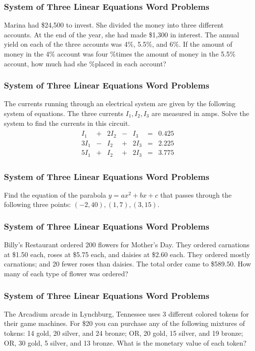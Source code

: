 \documentclass[xcolor=dvipsnames]{beamer}
\begin{document}
\begin{frame}
  \frametitle{System of Three Linear Equations Word Problems}
  {\ubung} Marina had \$24,500 to invest. She divided the money into
  three different accounts. At the end of the year, she had made
  \$1,300 in interest. The annual yield on each of the three accounts
  was 4\%, 5.5\%, and 6\%. If the amount of money in the 4\% account
  was four \%times the amount of money in the 5.5\% account, how much
  had she \%placed in each account?
\end{frame}

\begin{frame}
  \frametitle{System of Three Linear Equations Word Problems}
  {\ubung} The currents running through an electrical system are given
  by the following system of equations. The three currents $I_{1},I_{2},I_{3}$
  are measured in amps. Solve the system to find the currents in this
  circuit.
  \begin{align}
    \label{eq:oemeyeib}
    \begin{array}{clclclc}
    I_{1} & + & 2I_{2} & - & I_{3} & = & 0.425 \\
    3I_{1} & - & I_{2} & + & 2I_{3} & = & 2.225 \\
    5I_{1} & + & I_{2} & + & 2I_{3} & = & 3.775
    \end{array}
  \end{align}
\end{frame}

\begin{frame}
  \frametitle{System of Three Linear Equations Word Problems}
  {\ubung} Find the equation of the parabola $y=ax^{2}+bx+c$ that
  passes through the following three points: $(-2,40),(1,7),(3,15)$.
\end{frame}

\begin{frame}
  \frametitle{System of Three Linear Equations Word Problems}
  {\ubung} Billy's Restaurant ordered 200 flowers for Mother's Day.
  They ordered carnations at \$1.50 each, roses at \$5.75 each, and
  daisies at \$2.60 each. They ordered mostly carnations; and 20 fewer
  roses than daisies. The total order came to \$589.50. How many of
  each type of flower was ordered?
\end{frame}

\begin{frame}
  \frametitle{System of Three Linear Equations Word Problems}
  {\ubung} The Arcadium arcade in Lynchburg, Tennessee uses 3
  different colored tokens for their game machines. For \$20 you can
  purchase any of the following mixtures of tokens: 14 gold, 20
  silver, and 24 bronze; OR, 20 gold, 15 silver, and 19 bronze; OR, 30
  gold, 5 silver, and 13 bronze. What is the monetary value of each
  token?
\end{frame}
\end{document}
